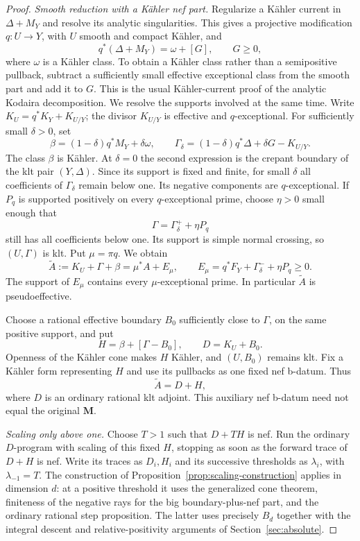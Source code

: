 \begin{proof}
\smallskip\noindent
\emph{Smooth reduction with a K\"ahler nef part.}
Regularize a K\"ahler current in $\Delta+M_Y$ and resolve its analytic
singularities. This gives a projective modification $q:U\to Y$,
with $U$ smooth and compact K\"ahler, and
\[
 q^*(\Delta+M_Y)=\omega+[G],\qquad G\geq0,
\]
where $\omega$ is a K\"ahler class. To obtain a K\"ahler class rather
than a semipositive pullback, subtract a sufficiently small effective
exceptional class from the smooth part and add it to $G$. This is the
usual K\"ahler-current proof of the analytic Kodaira decomposition.
We resolve the supports involved at the same time. Write
$K_U=q^*K_Y+K_{U/Y}$; the divisor $K_{U/Y}$ is effective and
$q$-exceptional. For sufficiently small $\delta>0$, set
\[
 \beta=(1-\delta)q^*M_Y+\delta\omega,
 \qquad
 \Gamma_\delta=(1-\delta)q^*\Delta+\delta G-K_{U/Y}.
\]
The class $\beta$ is K\"ahler. At $\delta=0$ the second expression
is the crepant boundary of the klt pair $(Y,\Delta)$. Since its
support is fixed and finite, for small $\delta$ all coefficients of
$\Gamma_\delta$ remain below one. Its negative components are
$q$-exceptional. If $P_q$ is supported positively on every
$q$-exceptional prime, choose $\eta>0$ small enough that
\[
 \Gamma=\Gamma_\delta^++\eta P_q
\]
still has all coefficients below one. Its support is simple normal
crossing, so $(U,\Gamma)$ is klt. Put $\mu=\pi q$. We obtain
\begin{equation}\label{repair:eq:good-model-smooth-error}
 \widetilde A:=K_U+\Gamma+\beta
   =\mu^*A+E_\mu,
 \qquad
 E_\mu=q^*F_Y+\Gamma_\delta^-+\eta P_q\geq0.
\end{equation}
The support of $E_\mu$ contains every $\mu$-exceptional prime.
In particular $\widetilde A$ is pseudoeffective.

Choose a rational effective boundary $B_0$ sufficiently close to
$\Gamma$, on the same positive support, and put
\[
 H=\beta+[\Gamma-B_0],\qquad D=K_U+B_0.
\]
Openness of the K\"ahler cone makes $H$ K\"ahler, and $(U,B_0)$
remains klt. Fix a K\"ahler form representing $H$ and use its
pullbacks as one fixed nef b-datum. Thus
\begin{equation}\label{repair:eq:good-model-rationalization}
 \widetilde A=D+H,
\end{equation}
where $D$ is an ordinary rational klt adjoint. This auxiliary nef
b-datum need not equal the original $\mathbf M$.

\smallskip\noindent
\emph{Scaling only above one.}
Choose $T>1$ such that $D+TH$ is nef. Run the ordinary $D$-program
with scaling of this fixed $H$, stopping as soon as the forward trace
of $D+H$ is nef. Write its traces as $D_i,H_i$ and its successive
thresholds as $\lambda_i$, with $\lambda_{-1}=T$. The construction
of Proposition~\ref{prop:scaling-construction} applies in dimension
$d$: at a positive threshold it uses the generalized cone theorem,
finiteness of the negative rays for the big
boundary-plus-nef part, and the ordinary rational step proposition.
The latter uses precisely $B_d$ together with the integral descent
and relative-positivity arguments of Section~\ref{sec:absolute}.


\end{proof}
